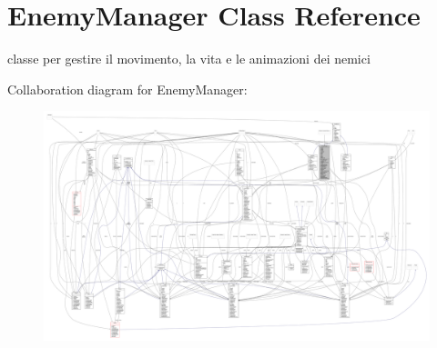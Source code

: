 \hypertarget{classmanagers_1_1_enemy_manager}{}\section{Enemy\+Manager Class Reference}
\label{classmanagers_1_1_enemy_manager}


classe per gestire il movimento, la vita e le animazioni dei nemici  




Collaboration diagram for Enemy\+Manager\+:
\nopagebreak
\begin{figure}[H]
\begin{center}
\leavevmode
\includegraphics[width=350pt]{classmanagers_1_1_enemy_manager__coll__graph}
\end{center}
\end{figure}
